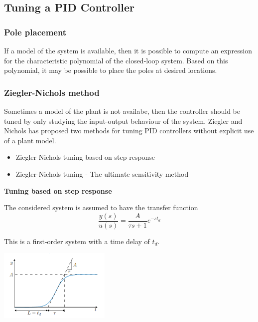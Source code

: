 \subsection{Tuning a PID Controller}
\subsubsection{Pole placement}

If a model of the system is available, then it is possible to compute an expression
for the characteristic polynomial of the closed-loop system. Based on this polynomial,
it may be possible to place the poles at desired locations.

\subsubsection{Ziegler-Nichols method}

Sometimes a model of the plant is not availabe, then the controller should be tuned
by only studying the input-output behaviour of the system.
Ziegler and Nichols has proposed two methods for tuning PID controllers without
explicit use of a plant model.

\begin{itemize}
	\item{Ziegler-Nichols tuning based on step response}
	\item{Ziegler-Nichols tuning - The ultimate sensitivity method}
\end{itemize}


\textbf{Tuning based on step response}

The considered system is assumed to have the transfer function
$$\frac{y(s)}{u(s)} = \frac{A}{\tau s + 1} e^{-st_d}$$

This is a first-order system with a time delay of $t_d$.

\begin{center}
	\includegraphics[width=0.4\textwidth]{Images/zieglerTuning.png}
\end{center}


